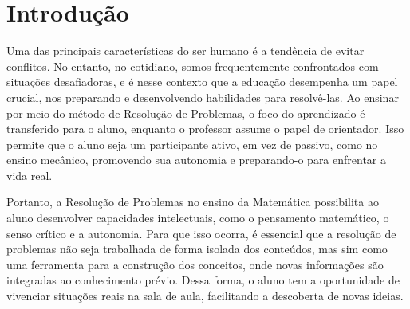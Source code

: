 




\pretextual{} %

\imprimircapa{} %
\imprimirfolhaderosto{} %













\textual{} %

\chapter{Introdução} \label{cap:1_introducao}

Uma das principais características do ser humano é a tendência de evitar conflitos. No entanto, no cotidiano, somos frequentemente confrontados com situações desafiadoras, e é nesse contexto que a educação desempenha um papel crucial, nos preparando e desenvolvendo habilidades para resolvê-las. Ao ensinar por meio do método de Resolução de Problemas, o foco do aprendizado é transferido para o aluno, enquanto o professor assume o papel de orientador. Isso permite que o aluno seja um participante ativo, em vez de passivo, como no ensino mecânico, promovendo sua autonomia e preparando-o para enfrentar a vida real.

Portanto, a Resolução de Problemas no ensino da Matemática possibilita ao aluno desenvolver capacidades intelectuais, como o pensamento matemático, o senso crítico e a autonomia. Para que isso ocorra, é essencial que a resolução de problemas não seja trabalhada de forma isolada dos conteúdos, mas sim como uma ferramenta para a construção dos conceitos, onde novas informações são integradas ao conhecimento prévio. Dessa forma, o aluno tem a oportunidade de vivenciar situações reais na sala de aula, facilitando a descoberta de novas ideias.

